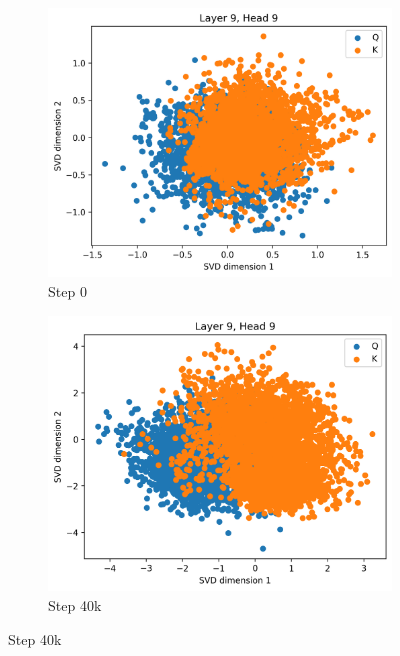 \begin{appendices}
\begin{figure}[ht]
    \centering
    \begin{subfigure}[b]{0.24\linewidth}
         \includegraphics[width=\linewidth]{sources/part_1/anisotropy/imgs/dist_l9h9_s0_K.png}
         \caption{Step 0}
         \label{fig:dist_qk_s0_K}
    \end{subfigure}
    \begin{subfigure}[b]{0.24\linewidth}
         \includegraphics[width=\linewidth]{sources/part_1/anisotropy/imgs/dist_l9h9_s40_K.png}
         \caption{Step 40k}
         \label{fig:dist_qk_s40_K}
    \end{subfigure}

\end{figure}
\end{appendices}
